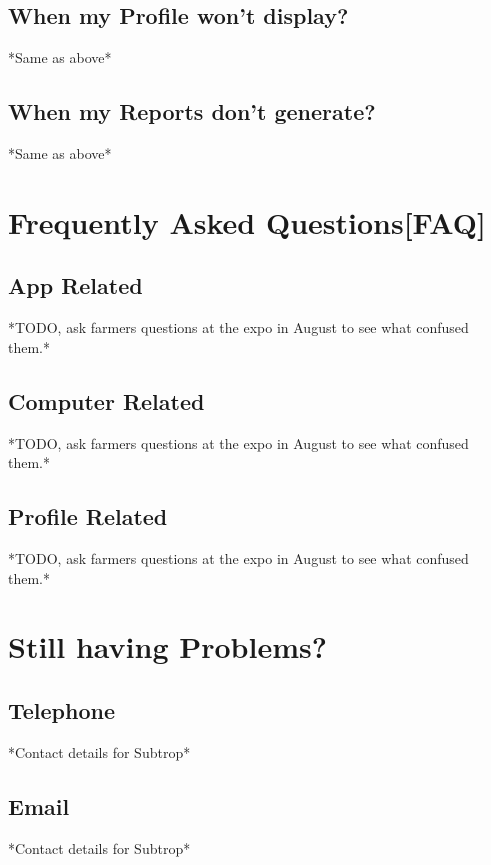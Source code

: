 \documentclass[11pt,fleqn]{book} %
\begin{document}
	\section{When my Profile won't display?}
		*Same as above*
	\section{When my Reports don't generate?}
		*Same as above*


\chapter{Frequently Asked Questions[FAQ]}
	\section{App Related}
	*TODO, ask farmers questions at the expo in August to see what confused them.*
	\section{Computer Related}
	*TODO, ask farmers questions at the expo in August to see what confused them.*
	\section{Profile Related}
	*TODO, ask farmers questions at the expo in August to see what confused them.*
	


\chapter{Still having Problems?}
	\section{Telephone}
		*Contact details for Subtrop*
	\section{Email}
		*Contact details for Subtrop*
\end{document}
